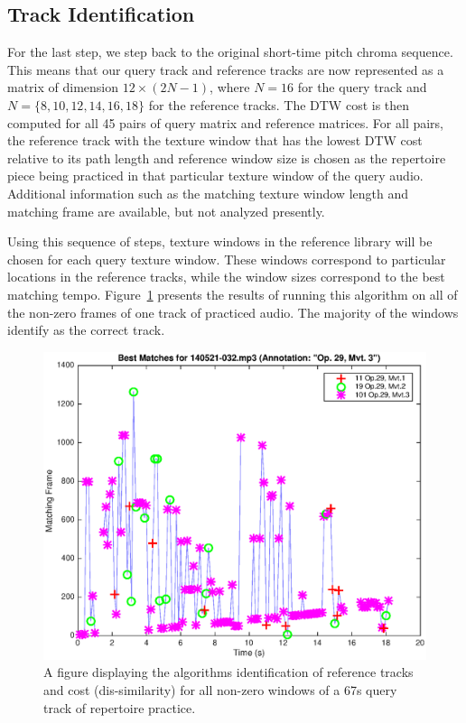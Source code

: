 \documentclass{article}
\begin{document}
\subsection{Track Identification}
\label{sec:DTW}
For the last step, we step back to the original short-time pitch chroma sequence. This means that our query track and reference tracks are now represented as a matrix of dimension $12\times (2N-1)$, where $N=16$ for the query track and $N=\{8,10,12,14,16,18\}$ for the reference tracks.
%
The DTW cost is then computed for all 45 pairs of query matrix and reference matrices. For all pairs, the reference track with the texture window that has the lowest DTW cost relative to its path length and reference window size 
is chosen as the repertoire piece being practiced in that particular texture window of the query audio.  Additional information such as the matching texture window length and matching frame are available, but not analyzed presently. 

Using this sequence of steps, texture windows in the reference library will be chosen for each query texture window. These windows correspond to particular locations in the reference tracks, while the window sizes correspond to the best matching tempo. 
Figure~\ref{fig:140514-013} 
presents the results of running this algorithm on all of the non-zero frames of one track of practiced audio. The majority of the windows identify as the correct track.

\begin{figure}
\includegraphics[width=\linewidth]{figs/minMatchingFrames.eps}
\caption{A figure displaying the algorithms identification of reference tracks and cost (dis-similarity) for all non-zero windows of a 67s query track of repertoire practice.}
\label{fig:140514-013}
\end{figure}
\end{document}

